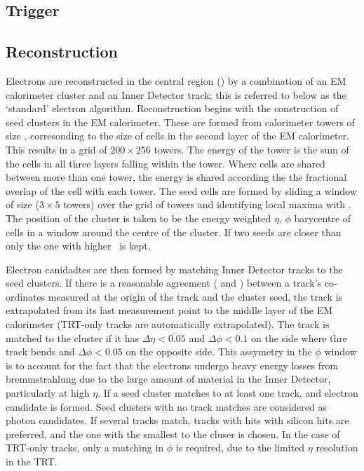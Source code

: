 \subsection{Trigger}
\label{sec:reco-el-triggers}

\subsection{Reconstruction}
Electrons are reconstructed in the central region () by a
combination of an EM calorimeter cluster and an Inner Detector track; this is
referred to below as the `standard' electron algorithm. Reconstruction begins
with the construction of seed clusters in the EM calorimeter. These are formed from
calorimeter towers of size , corresonding to the
size of cells in the second layer of the EM calorimeter. This
results in a grid of $200 \times 256$ towers. The energy
of the tower is the sum of the cells in all three layers
falling within the tower. Where cells are shared between more than one tower, the
energy is shared according the the fractional overlap of the cell with each
tower. The seed cells are formed by sliding a
window of size  ($3 \times 5$ towers) over the
grid of towers and identifying local maxima with . The position
of the cluster is taken to be the energy weighted $\eta$, $\phi$ barycentre of
cells in a window around the centre of the cluster. If two seeds are closer than
 only the one with higher \et\ is kept.

Electron canidadtes are then formed by matching Inner Detector tracks to the
seed clusters. If there is a reasonable agreement ( and
) between a track's co-ordinates measured at the origin of the track and
the cluster seed, the track is extrapolated from its last measurement point to
the middle layer of the EM calorimeter (TRT-only tracks are automatically
extrapolated). The track is matched to the cluster if it has $\Delta \eta <
0.05$ and $\Delta \phi < 0.1$ on the side where thre track bends and  $\Delta
\phi < 0.05$ on the opposite side. This assymetry in the $\phi$ window is to
account for the fact that the electrons undergo heavy energy losses from
bremmstrahlung due to the large amount of material in the Inner Detector,
particularly at high $\eta$. If a seed cluster matches to at least one track,
and electron candidate is formed. Seed clusters with no track matches are
considered as photon candidates. If several tracks match, tracks with hits with
silicon hits are preferred, and the one with the smallest \deltaR to the cluser
is chosen. In the case of TRT-only tracks, only a matching in $\phi$ is required, 
due to the limited $\eta$ resolution in the TRT.

